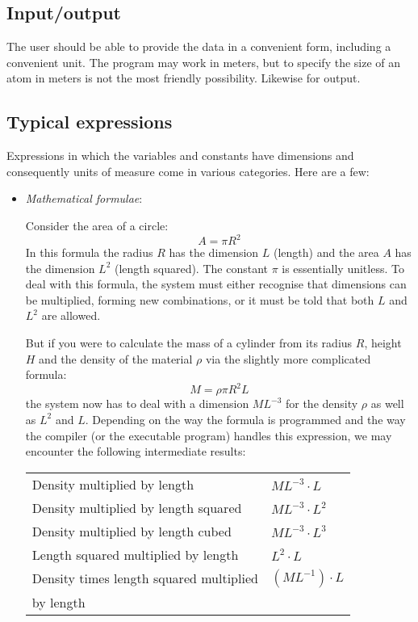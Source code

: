 \documentclass{article}
\begin{document}
\subsection*{Input/output}
The user should be able to provide the data in a convenient form, including a convenient unit. The program may work in meters,
but to specify the size of an atom in meters is not the most friendly possibility. Likewise for output.

\subsection*{Typical expressions}
Expressions in which the variables and constants have dimensions and consequently units of measure come in various
categories. Here are a few:
\begin{itemize}
\item
\emph{Mathematical formulae}:

\noindent Consider the area of a circle:
\begin{equation}
    A = \pi R^2
\end{equation}
%
In this formula the radius $R$ has the dimension $L$ (length) and the area $A$ has the dimension $L^2$ (length squared). The
constant $\pi$ is essentially unitless. To deal with this formula, the system must either recognise that dimensions can
be multiplied, forming new combinations, or it must be told that both $L$ and $L^2$ are allowed.

But if you were to calculate the mass of a cylinder from its radius $R$, height $H$ and the density of the material $\rho$
via the slightly more complicated formula:
\begin{equation}
    M = \rho \pi R^2 L
\end{equation}
\noindent the system now has to deal with a dimension $M L^{-3}$ for the density $\rho$ as well as $L^2$ and $L$. Depending on the way the
formula is programmed and the way the compiler (or the executable program) handles this expression, we may encounter the
following intermediate results:

\vspace{\baselineskip}
\begin{tabular}{ll}
\hline
Density multiplied by length                       &   $M L^{-3} \cdot L$   \\
Density multiplied by length squared               &   $M L^{-3} \cdot L^2$ \\
Density multiplied by length cubed                 &   $M L^{-3} \cdot L^3$ \\
Length squared multiplied by length                &   $L^2 \cdot L$        \\
Density times length squared multiplied            &   $(M L^{-1}) \cdot L$ \\
by length                                          &                        \\
\hline
\end{tabular}
\vspace{\baselineskip}


\end{itemize}
\end{document}
